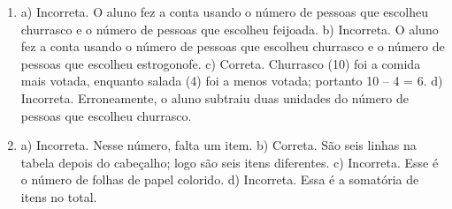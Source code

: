 \begin{enumerate}
\item
a) Incorreta. O aluno fez a conta usando o número de pessoas que escolheu churrasco e o número de pessoas que escolheu feijoada.
b) Incorreta. O aluno fez a conta usando o número de pessoas que escolheu churrasco e o número de pessoas que escolheu estrogonofe.
c) Correta. Churrasco (10) foi a comida mais votada, enquanto salada (4) foi a menos votada; portanto 10 -- 4 = 6.
d) Incorreta. Erroneamente, o aluno subtraiu duas unidades do número de pessoas que escolheu churrasco.

\item
a) Incorreta. Nesse número, falta um item.
b) Correta. São seis linhas na tabela depois do cabeçalho; logo são seis itens diferentes.
c) Incorreta. Esse é o número de folhas de papel colorido.
d) Incorreta. Essa é a somatória de itens no total.
\end{enumerate}